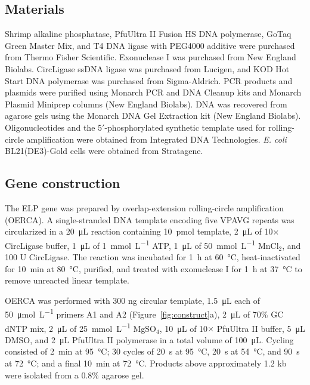 \documentclass[11pt]{article}
\begin{document}
\subsection{Materials}
Shrimp alkaline phosphatase, PfuUltra II Fusion HS DNA polymerase, GoTaq Green Master Mix, and T4 DNA ligase with PEG4000 additive were purchased from Thermo Fisher Scientific. Exonuclease I was purchased from New England Biolabs. CircLigase ssDNA ligase was purchased from Lucigen, and KOD Hot Start DNA polymerase was purchased from Sigma-Aldrich. PCR products and plasmids were purified using Monarch PCR and DNA Cleanup kits and Monarch Plasmid Miniprep columns (New England Biolabs). DNA was recovered from agarose gels using the Monarch DNA Gel Extraction kit (New England Biolabs). Oligonucleotides and the 5$'$-phosphorylated synthetic template used for rolling-circle amplification were obtained from Integrated DNA Technologies. \textit{E. coli} BL21(DE3)-Gold cells were obtained from Stratagene.

\subsection{Gene construction}
The ELP gene was prepared by overlap-extension rolling-circle amplification (OERCA).\cite{Amiram2011-la} A single-stranded DNA template encoding five VPAVG repeats was circularized in a \SI{20}{\micro\liter} reaction containing \SI{10}{\pico\mole} template, \SI{2}{\micro\liter} of 10$\times$ CircLigase buffer, \SI{1}{\micro\liter} of \SI{1}{\milli\mole\per\liter} ATP, \SI{1}{\micro\liter} of \SI{50}{\milli\mole\per\liter} MnCl$_2$, and 100 U CircLigase. The reaction was incubated for \SI{1}{\hour} at \SI{60}{\degreeCelsius}, heat-inactivated for \SI{10}{\minute} at \SI{80}{\degreeCelsius}, purified, and treated with exonuclease I for \SI{1}{\hour} at \SI{37}{\degreeCelsius} to remove unreacted linear template.

OERCA was performed with 300 ng circular template, \SI{1.5}{\micro\liter} each of \SI{50}{\micro\mole\per\liter} primers A1 and A2 (Figure~\ref{fig:construct}a), \SI{2}{\micro\liter} of 70\% GC dNTP mix, \SI{2}{\micro\liter} of \SI{25}{\milli\mole\per\liter} MgSO$_4$, \SI{10}{\micro\liter} of 10$\times$ PfuUltra II buffer, \SI{5}{\micro\liter} DMSO, and \SI{2}{\micro\liter} PfuUltra II polymerase in a total volume of \SI{100}{\micro\liter}. Cycling consisted of \SI{2}{\minute} at \SI{95}{\degreeCelsius}; 30 cycles of \SI{20}{\second} at \SI{95}{\degreeCelsius}, \SI{20}{\second} at \SI{54}{\degreeCelsius}, and \SI{90}{\second} at \SI{72}{\degreeCelsius}; and a final \SI{10}{\minute} at \SI{72}{\degreeCelsius}. Products above approximately 1.2 kb were isolated from a 0.8\% agarose gel.
\end{document}
